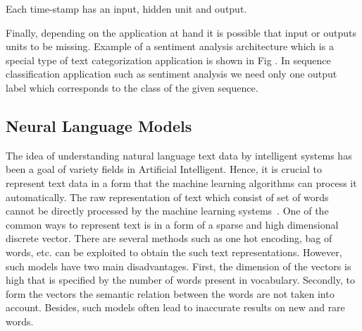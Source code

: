 Each time-stamp has an input, hidden unit and output. 

Finally, depending on the application at hand it is possible that input or outputs units to be missing. Example of a sentiment analysis architecture which is a special type of text categorization application is shown in Fig . In sequence classification application such as sentiment analysis we need only one output label which corresponds to the class of the given sequence. 

\subsection{Neural Language Models}
The idea of understanding natural language text data by intelligent systems has been a goal of variety fields in Artificial Intelligent. Hence, it is crucial to represent text data in a form that the machine learning algorithms can process it automatically.  %
The raw representation of text which consist of set of words cannot be directly processed by the machine learning systems~\cite{srinivasan2017guide}. One of the common ways to represent text is %
in a form of a sparse and high dimensional discrete vector. There are several methods such as one hot encoding, bag of words, etc. can be exploited to obtain the such text representations. However, such models have two main disadvantages. First, the dimension of the vectors is high that is specified by the number of words present in vocabulary.  Secondly, to form the vectors the semantic relation between the words are not taken into account.  Besides, such models often lead to inaccurate results on new and rare words. 

